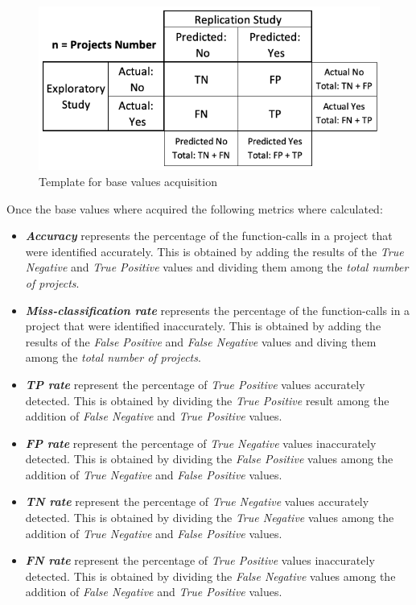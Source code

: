\begin{figure}[ht]
\centering
\includegraphics[width=1\textwidth]{images/replication_statistics.png}
\caption{Template for base values acquisition}
\label{fig:replicationStatistics}
\end{figure}

Once the base values where acquired the following metrics where calculated:
\begin{itemize}
    \item \textbf{\textit{Accuracy}} represents the percentage of the function-calls in a project that were identified accurately. This is obtained by adding the results of the \textit{True Negative} and \textit{True Positive} values and dividing them among the \textit{total number of projects}.
    \item \textbf{\textit{Miss-classification rate}} represents the percentage of the function-calls in a project that were identified inaccurately. This is obtained by adding the results of the \textit{False Positive} and \textit{False Negative} values and diving them among the \textit{total number of projects}.
    \item \textbf{\textit{TP rate}} represent the percentage of \textit{True Positive} values accurately detected. This is obtained by dividing the \textit{True Positive} result among the addition of \textit{False Negative} and \textit{True Positive} values.
    \item \textbf{\textit{FP rate}} represent the percentage of \textit{True Negative} values inaccurately detected. This is obtained by dividing the \textit{False Positive} values among the addition of \textit{True Negative} and \textit{False Positive} values.
    \item \textbf{\textit{TN rate}} represent the percentage of \textit{True Negative} values accurately detected. This is obtained by dividing the \textit{True Negative} values among the addition of \textit{True Negative} and \textit{False Positive} values.
    \item \textbf{\textit{FN rate}} represent the percentage of \textit{True Positive} values inaccurately detected. This is obtained by dividing the \textit{False Negative} values among the addition of \textit{False Negative} and \textit{True Positive} values.
\end{itemize}

